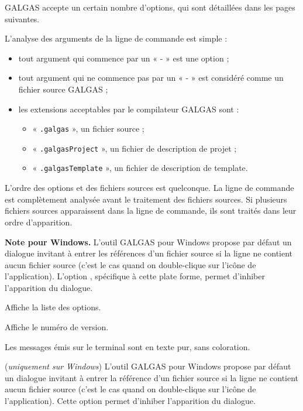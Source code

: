 {GALGAS accepte un certain nombre d’options, qui sont détaillées dans les pages suivantes.

L’analyse des arguments de la ligne de commande est simple :
\begin{itemize}
  \item tout argument qui commence par un « - » est une option ;
  \item tout argument qui ne commence pas par un « - » est considéré comme un fichier source GALGAS ;
  \item les extensions acceptables par le compilateur GALGAS sont :
  \begin{itemize}
    \item « \texttt{.galgas} », un fichier source ;
    \item « \texttt{.galgasProject} », un fichier de description de projet ;
    \item « \texttt{.galgasTemplate} », un fichier de description de template.
  \end{itemize}
\end{itemize}

L’ordre des options et des fichiers sources est quelconque. La ligne de commande est complètement analysée avant le traitement des fichiers sources. Si plusieurs fichiers sources apparaissent dans la ligne de commande, ils sont traités dans leur ordre d’apparition.

{\bf Note pour Windows.} L’outil GALGAS pour Windows propose par défaut un dialogue invitant à entrer les références d’un fichier source si la ligne ne contient aucun fichier source (c’est le cas quand on double-clique sur l’icône de l’application). L'option , spécifique à cette plate forme, permet d'inhiber l’apparition du dialogue.


 Affiche la liste des options.

 Affiche le numéro de version.

 Les messages émis sur le terminal sont en texte pur, sans coloration.

 (\emph{uniquement sur Windows}) L’outil GALGAS pour Windows propose par défaut un dialogue invitant à entrer la référence d’un fichier source si la ligne ne contient aucun fichier source (c’est le cas quand on double-clique sur l’icône de l’application). Cette option permet d'inhiber l’apparition du dialogue.


}
